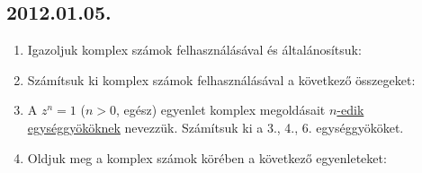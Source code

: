 \subsection*{2012.01.05.}
\begin{enumerate}
\item Igazoljuk komplex számok felhasználásával és általánosítsuk:
\item Számítsuk ki komplex számok felhasználásával a következő összegeket:

\item A $z^n=1$ ($n>0$, egész) egyenlet komplex megoldásait \underline{$n$-edik egységgyököknek} nevezzük. Számítsuk ki a 3., 4., 6. egységgyököket.
\item Oldjuk meg a komplex számok körében a következő egyenleteket:
\end{enumerate}

